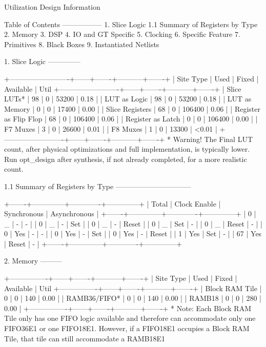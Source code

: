 \documentclass{article}
\begin{document}
\fi
\iffalse

Utilization Design Information

Table of Contents
-----------------
1. Slice Logic
1.1 Summary of Registers by Type
2. Memory
3. DSP
4. IO and GT Specific
5. Clocking
6. Specific Feature
7. Primitives
8. Black Boxes
9. Instantiated Netlists

1. Slice Logic
--------------

+-------------------------+------+-------+-----------+-------+
|        Site Type        | Used | Fixed | Available | Util%
+-------------------------+------+-------+-----------+-------+
| Slice LUTs*             |   98 |     0 |     53200 |  0.18 |
|   LUT as Logic          |   98 |     0 |     53200 |  0.18 |
|   LUT as Memory         |    0 |     0 |     17400 |  0.00 |
| Slice Registers         |   68 |     0 |    106400 |  0.06 |
|   Register as Flip Flop |   68 |     0 |    106400 |  0.06 |
|   Register as Latch     |    0 |     0 |    106400 |  0.00 |
| F7 Muxes                |    3 |     0 |     26600 |  0.01 |
| F8 Muxes                |    1 |     0 |     13300 | <0.01 |
+-------------------------+------+-------+-----------+-------+
* Warning! The Final LUT count, after physical optimizations and full implementation, is typically lower. Run opt_design after synthesis, if not already completed, for a more realistic count.


1.1 Summary of Registers by Type
--------------------------------

+-------+--------------+-------------+--------------+
| Total | Clock Enable | Synchronous | Asynchronous |
+-------+--------------+-------------+--------------+
| 0     |            _ |           - |            - |
| 0     |            _ |           - |          Set |
| 0     |            _ |           - |        Reset |
| 0     |            _ |         Set |            - |
| 0     |            _ |       Reset |            - |
| 0     |          Yes |           - |            - |
| 0     |          Yes |           - |          Set |
| 0     |          Yes |           - |        Reset |
| 1     |          Yes |         Set |            - |
| 67    |          Yes |       Reset |            - |
+-------+--------------+-------------+--------------+


2. Memory
---------

+----------------+------+-------+-----------+-------+
|    Site Type   | Used | Fixed | Available | Util%
+----------------+------+-------+-----------+-------+
| Block RAM Tile |    0 |     0 |       140 |  0.00 |
|   RAMB36/FIFO* |    0 |     0 |       140 |  0.00 |
|   RAMB18       |    0 |     0 |       280 |  0.00 |
+----------------+------+-------+-----------+-------+
* Note: Each Block RAM Tile only has one FIFO logic available and therefore can accommodate only one FIFO36E1 or one FIFO18E1. However, if a FIFO18E1 occupies a Block RAM Tile, that tile can still accommodate a RAMB18E1
\end{document}
